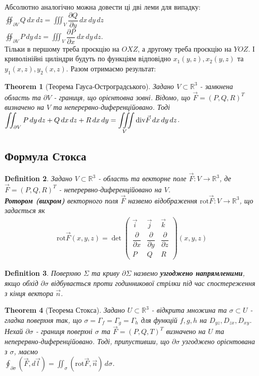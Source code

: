\documentclass[a4paper, 10pt]{article}
\def\departial#1#2{\dfrac{\partial {#1}}{\partial {#2}}}
\theoremstyle{theoremdd}
\newtheorem{theorem}{Theorem}[subsection]
\theoremstyle{theoremdd}
\newtheorem{definition}[theorem]{Definition}
\theoremstyle{theoremdd}
\theoremstyle{theoremdd}
\theoremstyle{theoremdd}
\theoremstyle{theoremdd}
\theoremstyle{theoremdd}
\theoremstyle{theoremdd}
\begin{document}
Абсолютно аналогічно можна довести ці дві леми для випадку:\\
$\displaystyle\oiint_{\partial V}Q\,dx\,dz = \iiint_V \departial{Q}{y}\,dx\,dy\,dz$\\
$\displaystyle\oiint_{\partial V}P\,dy\,dz = \iiint_V \departial{P}{x}\,dx\,dy\,dz$.\\
Тільки в першому треба проєкцію на $OXZ$, а другому треба проєкцію на $YOZ$. І криволінійні циліндри будуть по функціям відповідно $x_1(y,z),x_2(y,z)$ та $y_1(x,z), y_2(x,z)$. Разом отримаємо результат:

\begin{theorem}[Теорема Гауса-Остроградського]
Задано $V \subset \mathbb{R}^3$ - замкнена область та $\partial V$ - границя, що орієнтовна зовні. Відомо, що $\vec{F} = (P,Q,R)^T$ визначено на $V$ та неперервно-диференційовано. Тоді\\
$\displaystyle\iint_{\partial V} P\,dy\,dz + Q\,dx\,dz + R\,dx\,dy = \iiint\displaylimits_V \text{div} \vec{F}\,dx\,dy\,dz$. 
\end{theorem}

\subsection{Формула Стокса}
\begin{definition}
Задано $V \subset \mathbb{R}^3$ - область та векторне поле $\vec{F}: V \to \mathbb{R}^3$, де $\vec{F} = (P,Q,R)^T$ - неперервно-диференційовано на $V$.\\
\textbf{Ротором (вихром)} векторного поля $\vec{F}$ назвемо відображення $\text{rot}\vec{F}: V \to \mathbb{R}^3$, що задається як
\begin{align*}
\text{rot} \vec{F}(x,y,z) = \det \begin{pmatrix}
\vec{i} & \vec{j} & \vec{k} \\
\departial{}{x} & \departial{}{y} & \departial{}{z} \\
P & Q & R
\end{pmatrix} (x,y,z)
\end{align*}
\end{definition}

\begin{definition}
Поверхню $\Sigma$ та криву $\partial \Sigma$ назвемо \textbf{узгоджено напрямленими}, якщо обхід $\partial \sigma$ відбувається проти годинникової стрілки під час спостереження з кінця вектора $\vec{n}$.
\end{definition}

\begin{theorem}[Теорема Стокса]
Задано $U \subset \mathbb{R}^3$ - відкрита множина та $\sigma \subset U$ - гладка поверхня так, що $\sigma = \Gamma_f = \Gamma_g = \Gamma_h$ для функцій $f,g,h$ на $D_{yz},D_{zx},D_{xy}$.\\
Нехай $\partial \sigma$ - границя поверхні $\sigma$ та $\vec{F} = (P,Q,T)^T$ визначено на $U$ та неперервно-диференційовано. Тоді, припустивши, що $\partial \sigma$ узгоджено орієнтована з $\sigma$, маємо\\
$\displaystyle\oint_{\partial \sigma} (\vec{F}, d \vec{l}) = \iint_\sigma (\text{rot} \vec{F}, \vec{n})\,d\sigma$.
\end{theorem}
\end{document}

